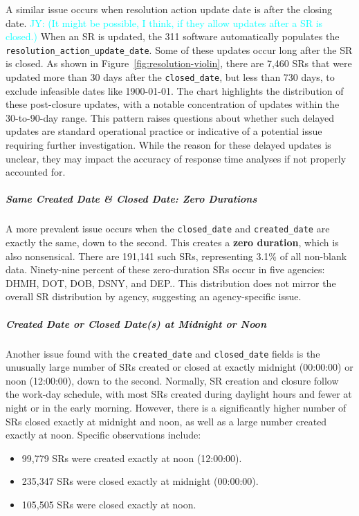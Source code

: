 \documentclass[linenumber]{jdsart}
\newcommand{\jy}[1]{\textcolor{cyan}{JY: (#1)}}
\begin{document}
A similar issue occurs when resolution action update date is after the
closing date. \jy{It might be possible, I think, if they allow updates
  after a SR is closed.}
When an SR is updated, the 311 software automatically populates the 
\texttt{resolution\_action\_update\_date}. Some of these updates 
occur long after the SR is closed. As shown in Figure~\ref{fig:resolution-violin}, 
there are 7,460 SRs that were updated more than 30 days after the 
\texttt{closed\_date}, but less than 730 days, to exclude infeasible 
dates like 1900-01-01. The chart highlights the distribution of these 
post-closure updates, with a notable concentration of updates within 
the 30-to-90-day range. This pattern raises questions about whether 
such delayed updates are standard operational practice or indicative 
of a potential issue requiring further investigation. While the reason 
for these delayed updates is unclear, they may impact the accuracy of 
response time analyses if not properly accounted for.
	
\subparagraph{Same Created Date \& Closed Date: Zero Durations}
A more prevalent issue occurs when the \texttt{closed\_date} and 
\texttt{created\_date} are exactly the same, down to the second. This 
creates a \textbf{zero duration}, which is also nonsensical. There 
are 191,141 such SRs, representing 3.1\% of all non-blank data. 
Ninety-nine percent of these zero-duration SRs occur in five agencies:
DHMH, DOT, DOB, DSNY, and DEP.. 
This distribution does not mirror the overall SR distribution by 
agency, suggesting an agency-specific issue.
	
		
\subparagraph{Created Date or Closed Date(s) at Midnight or Noon}
Another issue found with the \texttt{created\_date} and 
\texttt{closed\_date} fields is the unusually large number of SRs 
created or closed at exactly midnight (00:00:00) or noon (12:00:00), 
down to the second. Normally, SR creation and closure follow the 
work-day schedule, with most SRs created during daylight hours and 
fewer at night or in the early morning. However, there is a 
significantly higher number of SRs closed exactly at midnight and noon, 
as well as a large number created exactly at noon. Specific observations 
include:
\begin{itemize}
    \item 99,779 SRs were created exactly at noon (12:00:00).
    \item 235,347 SRs were closed exactly at midnight (00:00:00).
    \item 105,505 SRs were closed exactly at noon.
\end{itemize}
\end{document}
